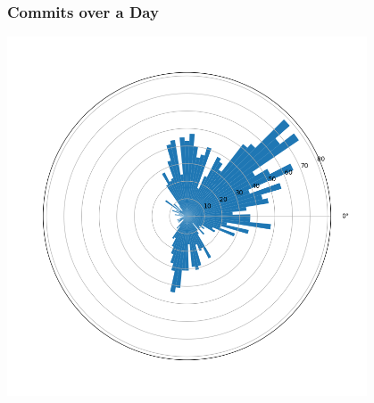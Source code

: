 \documentclass{beamer}
\begin{document}
\begin{frame}\frametitle{Commits over a Day}
\centering
\includegraphics[width=0.8\textwidth]{dayperiod_polar.png}
\end{frame}
\end{document}
